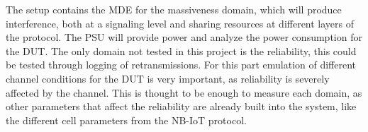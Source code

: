 The setup contains the MDE for the massiveness domain, which will produce interference, both at a signaling level and sharing resources at different layers of the protocol. The PSU will provide power and analyze the power consumption for the DUT. The only domain not tested in this project is the reliability, this could be tested through logging of retransmissions. For this part emulation of different channel conditions for the DUT is very important, as reliability is severely affected by the channel. This is thought to be enough to measure each domain, as other parameters that affect the reliability are already built into the system, like the different cell parameters from the NB-IoT protocol.


